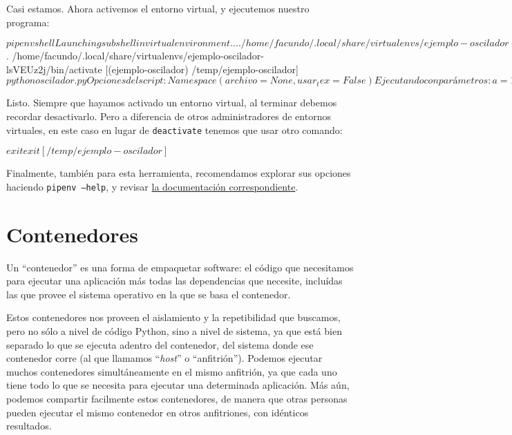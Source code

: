 Casi estamos. Ahora activemos el entorno virtual, y ejecutemos nuestro programa:

\begin{shell}
$ pipenv shell
Launching subshell in virtual environment...
 . /home/facundo/.local/share/virtualenvs/ejemplo-oscilador-lsVEUz2j/bin/activate
/temp/ejemplo-oscilador$  . /home/facundo/.local/share/virtualenvs/ejemplo-oscilador-lsVEUz2j/bin/activate
[(ejemplo-oscilador) /temp/ejemplo-oscilador]$ python oscilador.py 
Opciones del script: Namespace(archivo=None, usar_tex=False)
Ejecutando con parámetros: a=17 b=1 λ=15.4 µ=0.75
Config de matplotlib: {'font.size': 14, 'axes.labelsize': 'large'}
[(ejemplo-oscilador) /temp/ejemplo-oscilador]$ 
\end{shell}

Listo. Siempre que hayamos activado un entorno virtual, al terminar debemos recordar desactivarlo. Pero a diferencia de otros administradores de entornos virtuales, en este caso en lugar de \texttt{deactivate} tenemos que usar otro comando:

\begin{shell}
$ exit
exit
[/temp/ejemplo-oscilador]$ 
\end{shell}

Finalmente, también para esta herramienta, recomendamos explorar sus opciones haciendo \texttt{pipenv --help}, y revisar \href{https://pipenv-es.readthedocs.io/es/latest/}{la documentación correspondiente}.


\section{Contenedores} \label{sec:contenedores}

Un ``contenedor'' es una forma de empaquetar software: el código que necesitamos para ejecutar una aplicación más todas las dependencias que necesite, incluídas las que provee el sistema operativo en la que se basa el contenedor.

Estos contenedores nos proveen el aislamiento y la repetibilidad que buscamos, pero no sólo a nivel de código Python, sino a nivel de sistema, ya que está bien separado lo que se ejecuta adentro del contenedor, del sistema donde ese contenedor corre (al que llamamos ``\textit{host}'' o ``anfitrión''). Podemos ejecutar muchos contenedores simultáneamente en el mismo anfitrión, ya que cada uno tiene todo lo que se necesita para ejecutar una determinada aplicación. Más aún, podemos compartir facilmente estos contenedores, de manera que otras personas pueden ejecutar el mismo contenedor en otros anfitriones, con idénticos resultados.

